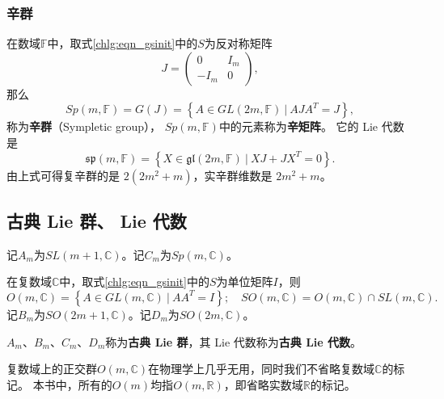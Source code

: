 \subsubsection{辛群}
在数域$\mathbb{F}$中，取式\eqref{chlg:eqn_gsinit}中的$S$为反对称矩阵
\begin{equation}
    J = \begin{pmatrix}
            0 & I_m \\ -I_m & 0
        \end{pmatrix},
\end{equation}
那么
\begin{equation}
    Sp(m,\mathbb{F})=G(J)= \left\{ A \in GL(2m,\mathbb{F})\ |\ A J {A}^T =J \right\},
\end{equation}
称为\textbf{辛群}（Sympletic group），
$Sp(m,\mathbb{F})$中的元素称为\textbf{辛矩阵}。
它的 Lie 代数是
\begin{equation}
    \mathfrak{sp}(m,\mathbb{F})= \left\{ X \in 
    \mathfrak{gl}(2m,\mathbb{F})\ |\ X J + J {X}^T =0 \right\}.
\end{equation}
由上式可得复辛群的是 $2(2m^2+m)$，实辛群维数是 $2m^2+m$。


\subsection{古典 Lie 群、 Lie 代数}\label{chlg:sec_clg}
  

记$A_m$为$SL(m+1,\mathbb{C})$。记$C_m$为$Sp(m,\mathbb{C})$。

在复数域$\mathbb{C}$中，取式\eqref{chlg:eqn_gsinit}中的$S$为单位矩阵$I$，则
\begin{equation*}
	O(m,\mathbb{C}) = \left\{ A \in GL(m,\mathbb{C})\ |\ A A^T =I \right\};
	\quad SO(m,\mathbb{C}) = O(m,\mathbb{C}) \cap SL(m,\mathbb{C}).
\end{equation*}
记$B_m$为$SO(2m+1,\mathbb{C})$。记$D_m$为$SO(2m,\mathbb{C})$。

$A_m$、$B_m$、$C_m$、$D_m$称为\textbf{古典 Lie 群}，其 Lie 代数称为\textbf{古典 Lie 代数}。

复数域上的正交群$O(m,\mathbb{C})$在物理学上几乎无用，同时我们不省略复数域$\mathbb{C}$的标记。
本书中，所有的$O(m)$均指$O(m,\mathbb{R})$，即省略实数域$\mathbb{R}$的标记。


